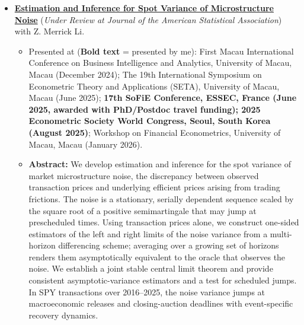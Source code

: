 \documentclass[12pt,a4paper]{article}
\begin{document}
\begin{itemize}
    \item \textbf{\href{https://www.researchgate.net/publication/417864546_Estimation_and_Inference_for_Spot_Variance_of_Microstructure_Noise?_tp=eyJjb250ZXh0Ijp7InBhZ2UiOiJwcm9maWxlIiwicHJldmlvdXNQYWdlIjoicHVibGljYXRpb24iLCJwb3NpdGlvbiI6InBhZ2VDb250ZW50Iiwic3ViUGFnZSI6Im92ZXJ2aWV3In19}
    {Estimation and Inference for Spot Variance of Microstructure Noise}} (\textit{Under Review at \textit{Journal of the American Statistical Association}})\\
    with Z. Merrick Li.
    \begin{itemize}[label=$\circ$, leftmargin=2.2em, itemsep=0.6em, topsep=0.3em]
        \item  Presented at (\textbf{Bold text} = presented by me): 
        First Macau International Conference on Business Intelligence and Analytics, 
        University of Macau, Macau (December 2024); 
        The 19th International Symposium on Econometric Theory and Applications (SETA), 
        University of Macau, Macau (June 2025); 
        \textbf{17th SoFiE Conference, ESSEC, 
        France (June 2025, awarded with PhD/Postdoc travel funding); 
        2025 Econometric Society World Congress, Seoul, South Korea (August 2025)}; 
        Workshop on Financial Econometrics, University of Macau, Macau (January 2026).
        \item \textbf{Abstract:} We develop estimation and inference for the spot variance of market microstructure
        noise, the discrepancy between observed transaction prices and underlying efficient
        prices arising from trading frictions. The noise is a stationary, serially dependent
        sequence scaled by the square root of a positive semimartingale that may jump at
        prescheduled times. Using transaction prices alone, we construct one-sided estimators of
        the left and right limits of the noise variance from a multi-horizon differencing
        scheme; averaging over a growing set of horizons renders them asymptotically equivalent
        to the oracle that observes the noise. We establish a joint stable central limit theorem
        and provide consistent asymptotic-variance estimators and a test for scheduled jumps. In
        SPY transactions over 2016--2025, the noise variance jumps at macroeconomic releases and
        closing-auction deadlines with event-specific recovery dynamics.\\
    \end{itemize}


\end{itemize}
\end{document}
